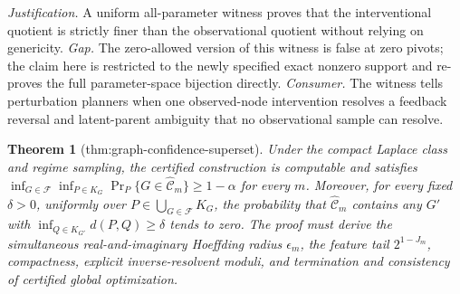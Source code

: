 \documentclass{article}
\newtheorem{theorem}{Theorem}
\begin{document}
\par\smallskip\noindent \textit{Justification.} A uniform all-parameter witness proves that the interventional quotient is strictly finer than the observational quotient without relying on genericity. \textit{Gap.} The zero-allowed version of this witness is false at zero pivots; the claim here is restricted to the newly specified exact nonzero support and re-proves the full parameter-space bijection directly. \textit{Consumer.} The witness tells perturbation planners when one observed-node intervention resolves a feedback reversal and latent-parent ambiguity that no observational sample can resolve.

\begin{theorem}[thm:graph-confidence-superset]\label{thm:graph-confidence-superset}
Under the compact Laplace class and regime sampling, the certified construction is computable and satisfies \(\inf_{G\in\mathcal F}\inf_{P\in K_G}\Pr_P\{G\in\widehat{\mathcal C}_m\}\ge1-\alpha\) for every \(m\). Moreover, for every fixed \(\delta>0\), uniformly over \(P\in\bigcup_{G\in\mathcal F}K_G\), the probability that \(\widehat{\mathcal C}_m\) contains any \(G'\) with \(\inf_{Q\in K_{G'}}d(P,Q)\ge\delta\) tends to zero. The proof must derive the simultaneous real-and-imaginary Hoeffding radius \(\epsilon_m\), the feature tail \(2^{1-J_m}\), compactness, explicit inverse-resolvent moduli, and termination and consistency of certified global optimization.
\end{theorem}
\end{document}
